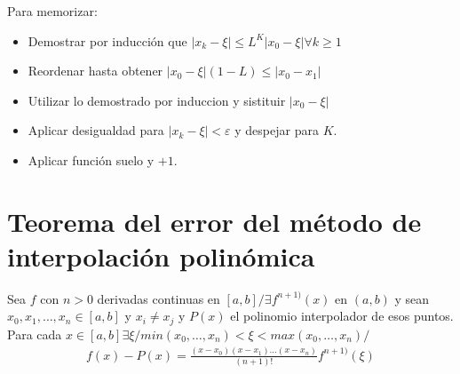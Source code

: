 \documentclass{article}
\begin{document}
Para memorizar:
\begin{itemize}
	\item Demostrar por inducción que \(|x_{k}-\xi | \leq L^{K} |x_{0}-\xi | \forall k \geq 1\)
	\item Reordenar hasta obtener \(|x_0 - \xi |(1-L) \leq |x_0-x_1|\)
	\item Utilizar lo demostrado por induccion y sistituir \(|x_0-\xi|\)
	\item Aplicar desigualdad para \(|x_k - \xi|<\varepsilon\) y despejar para \(K\).
	\item Aplicar función suelo y \(+1\). 
\end{itemize}
\section{Teorema del error del método de interpolación polinómica}
	Sea $f$ con $n > 0$ derivadas continuas en $[a,b]/\exists f^{n+1)}(x)$ en $(a,b)$ y sean $x_0, x_1,\dots,x_n \in [a,b]$ y 
	$x_i \neq x_j$ y $P(x)$ el polinomio interpolador de esos puntos.
	Para cada $x \in [a,b] \exists \xi / min(x_0,\dots,x_n) < \xi < max(x_0,\dots,x_n)/$
	\begin{equation}
		\begin{split}
			f(x)-P(x) = \frac{(x-x_0)(x-x_1)\dots(x-x_n)}{(n+1)!}f^{n+1)}(\xi)
		\end{split}
	\end{equation}
\end{document}
